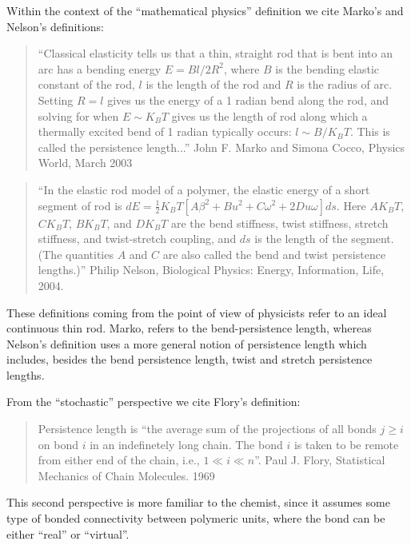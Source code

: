 Within the context of the ``mathematical physics'' definition we cite Marko's
and Nelson's definitions:

\begin{quotation}
``Classical elasticity tells us that a thin, straight rod that is bent
into an arc has a bending energy $E=Bl/2R^2$, where $B$ is the bending
elastic constant of the  rod, $l$ is the length of the  rod and $R$ is
the radius  of arc. Setting  $R=l$ gives us  the energy of a  1 radian
bend along the rod, and solving  for when $E \sim K_{B}T$ gives us the
length  of  rod along  which  a thermally  excited  bend  of 1  radian
typically occurs:  $l \sim B/K_{B}T$.  This is  called the persistence
length...'' John F. Marko and Simona Cocco, Physics World, March 2003
\end{quotation}

\begin{quotation}
``In the elastic rod model of a polymer, the elastic energy of a short
segment       of       rod       is       $dE=\frac{1}{2}       K_{B}T
[A\beta^2+Bu^2+C\omega^2+2Du\omega]  ds$.  Here  $AK_{B}T$, $CK_{B}T$,
$BK_{B}T$,  and $DK_{B}T$  are  the bend  stiffness, twist  stiffness,
stretch stiffness, and twist-stretch coupling, and $ds$ is the length of
the segment.   (The quantities $A$  and $C$ are  also called the  bend and
twist  persistence  lengths.)''   Philip Nelson,  Biological  Physics:
Energy, Information, Life, 2004.
\end{quotation}

These definitions coming from the point of view of physicists refer to
an ideal  continuous thin rod.  Marko, refers  to the bend-persistence
length,  whereas Nelson's  definition uses  a more  general  notion of
persistence length which includes, besides the bend persistence length,
twist and stretch persistence lengths.

From the ``stochastic'' perspective we cite Flory's definition:

\begin{quotation}
Persistence  length is  ``the average  sum of  the projections  of all
bonds $ j \geq i$ on bond $i$ in an indefinetely long chain.  The bond
$i$ is taken to be remote from either end of the chain, i.e., $1 \ll i
\ll   n$''.   Paul   J.   Flory,  Statistical   Mechanics   of   Chain
Molecules. 1969
\end{quotation}


This  second perspective  is more  familiar to  the chemist,  since it
assumes  some type  of  bonded connectivity  between polymeric  units,
where the bond can be either ``real'' or ``virtual''.

